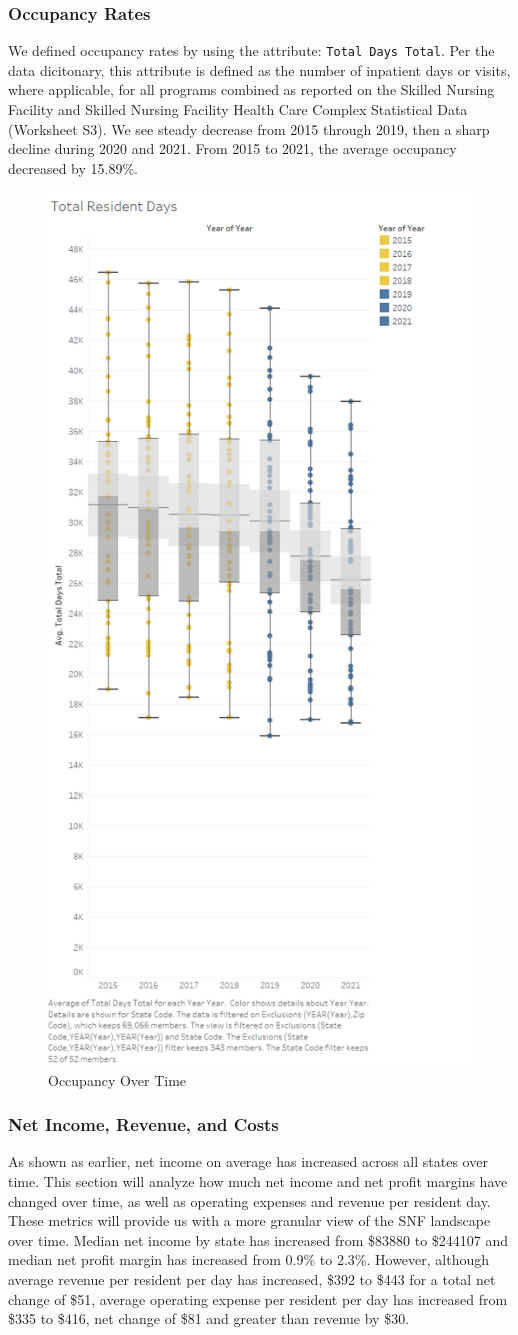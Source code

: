 \documentclass{article}
\theoremstyle{mytheoremstyle}
\theoremstyle{mytheoremstyle}
\theoremstyle{myproblemstyle}
\begin{document}
\subsubsection{Occupancy Rates}
We defined occupancy rates by using the attribute: \texttt{Total Days Total}. Per the data dicitonary, this attribute is defined as the number of inpatient days or visits, where applicable, for all programs combined as reported on the Skilled Nursing Facility and Skilled Nursing Facility Health Care Complex Statistical Data (Worksheet S3). We see steady decrease from 2015 through 2019, then a sharp decline during 2020 and 2021. From 2015 to 2021, the average occupancy decreased by 15.89\%.
\begin{figure}[htbp]
\centering
\includegraphics[width=0.5\linewidth]{Images/Total Resident Days.png}
\caption{Occupancy Over Time}
\label{totalresidentdays}
\end{figure}


\subsubsection{Net Income, Revenue, and Costs}
As shown as earlier, net income on average has increased across all states over time. This section will analyze how much net income and net profit margins have changed over time, as well as operating expenses and revenue per resident day. These metrics will provide us with a more granular view of the SNF landscape over time. 
Median net income by state has increased from \$83880 to \$244107 and median net profit margin has increased from 0.9\% to 2.3\%. However, although average revenue per resident per day has increased, \$392 to \$443 for a total net change of \$51, average operating expense per resident per day has increased from \$335 to \$416, net change of \$81 and greater than revenue by \$30. 
\end{document}
